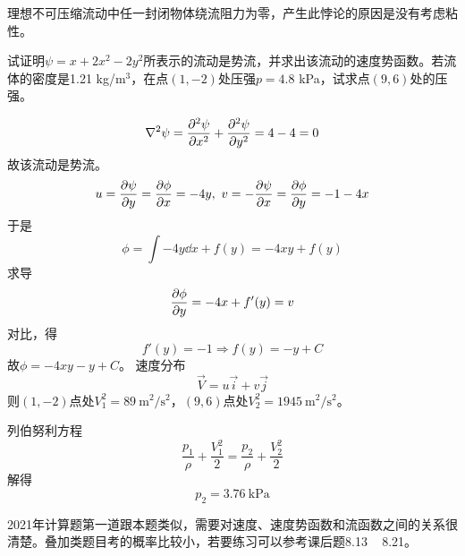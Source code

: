
理想不可压缩流动中任一封闭物体绕流阻力为零，产生此悖论的原因是没有考虑粘性。


\begin{example}
	试证明$\psi = x + 2x^2 - 2y^2$所表示的流动是势流，并求出该流动的速度势函数。若流体的密度是1.21 kg/m$^3$，在点$(1, -2)$处压强$p = 4.8$ kPa，试求点$(9, 6)$处的压强。
	
	\begin{equation*}
		\nabla^2 \psi = \pdv[2]{\psi}{x} + \pdv[2]{\psi}{y} = 4 - 4 = 0
	\end{equation*}
    故该流动是势流。
    \begin{equation*}
    	u = \pdv{\psi}{y} = \pdv{\phi}{x} = -4y, ~v = -\pdv{\psi}{x} = \pdv{\phi}{y} = -1 - 4x
    \end{equation*}
    于是
    \begin{equation*}
    	\phi = \int -4y \dd{x} + f(y) = -4xy + f(y)
    \end{equation*}
    求导
    \begin{equation*}
    	\pdv{\phi}{y} = -4x + f'(y) = v
    \end{equation*}
    对比，得
    \begin{equation*}
    	f'(y) = -1 \Rightarrow f(y) = -y + C
    \end{equation*}
    故$\phi = -4xy - y + C$。
    速度分布
    \begin{equation*}
    	\vec{V} = u \vec{i} + v \vec{j}
    \end{equation*}
    则$(1, -2)$点处$V_1^2 = 89 \mathrm{~m}^2 / \mathrm{s}^2$，$(9, 6)$点处$V_2^2 = 1945 \mathrm{~m}^2 / \mathrm{s}^2$。
    
    列伯努利方程
    \begin{equation*}
    	\dfrac{p_1}{\rho} + \dfrac{V_1^2}{2} = \dfrac{p_2}{\rho} + \dfrac{V_2^2}{2}
    \end{equation*}
    解得
    \begin{equation*}
    	p_2 = 3.76 \mathrm{~kPa}
    \end{equation*}
\end{example}

\begin{tip}
	2021年计算题第一道跟本题类似，需要对速度、速度势函数和流函数之间的关系很清楚。叠加类题目考的概率比较小，若要练习可以参考课后题8.13 ~ 8.21。
\end{tip}

